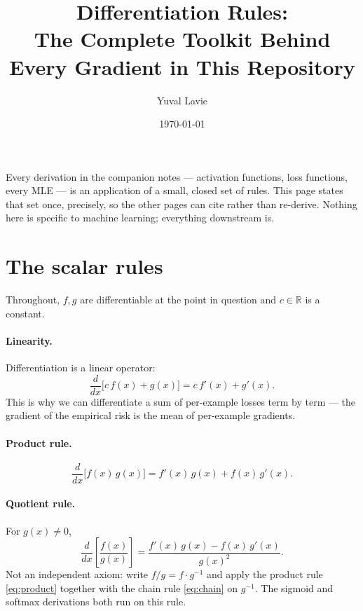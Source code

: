 \documentclass[11pt]{article}
\title{Differentiation Rules:\\
The Complete Toolkit Behind Every Gradient in This Repository}
\author{Yuval Lavie}
\date{\today}
\begin{document}
\maketitle

\noindent
Every derivation in the companion notes --- activation functions, loss
functions, every MLE --- is an application of a small, closed set of
rules. This page states that set once, precisely, so the other pages can
cite rather than re-derive. Nothing here is specific to machine
learning; everything downstream is.

\section{The scalar rules}

Throughout, $f, g$ are differentiable at the point in question and
$c \in \mathbb{R}$ is a constant.

\paragraph{Linearity.} Differentiation is a linear operator:
\begin{equation}
  \frac{d}{dx}\bigl[c\,f(x) + g(x)\bigr] = c\,f'(x) + g'(x).
  \label{eq:linearity}
\end{equation}
This is why we can differentiate a sum of per-example losses term by
term --- the gradient of the empirical risk is the mean of per-example
gradients.

\paragraph{Product rule.}
\begin{equation}
  \frac{d}{dx}\bigl[f(x)\,g(x)\bigr] = f'(x)\,g(x) + f(x)\,g'(x).
  \label{eq:product}
\end{equation}

\paragraph{Quotient rule.} For $g(x) \ne 0$,
\begin{equation}
  \frac{d}{dx}\left[\frac{f(x)}{g(x)}\right]
  = \frac{f'(x)\,g(x) - f(x)\,g'(x)}{g(x)^2}.
  \label{eq:quotient}
\end{equation}
Not an independent axiom: write $f/g = f \cdot g^{-1}$ and apply the
product rule \eqref{eq:product} together with the chain rule
\eqref{eq:chain} on $g^{-1}$. The sigmoid and softmax derivations both
run on this rule.
\end{document}
